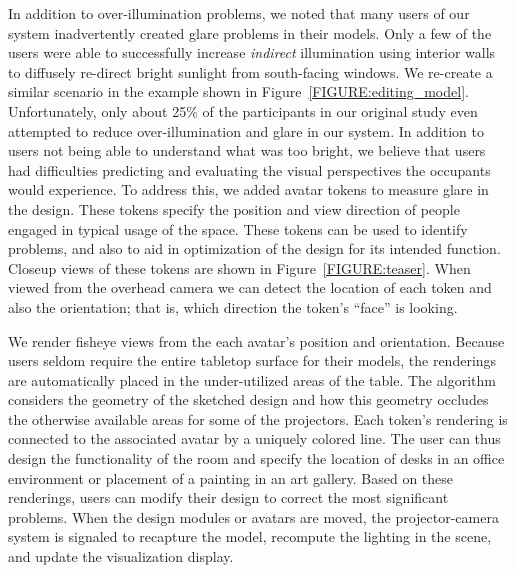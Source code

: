 \documentclass[10pt,twocolumn,letterpaper]{article}
\begin{document}
In addition to over-illumination problems, we noted that many users of
our system inadvertently created glare problems in their models.  Only
a few of the users were able to successfully increase {\em indirect}
illumination using interior walls to diffusely re-direct bright
sunlight from south-facing windows.  We re-create a similar scenario
in the example shown
in Figure~\ref{FIGURE:editing_model}.  Unfortunately, only about 25\%
of the participants in our original study even attempted to reduce
over-illumination and glare in our system.  In addition to users not
being able to understand what was too bright, we believe that users
had difficulties predicting and evaluating the visual perspectives the
occupants would experience.  To address this, we added avatar tokens
to measure glare in the design.  These tokens specify the position and
view direction of people engaged in typical usage of the space.  These
tokens can be used to identify problems, and also to aid in
optimization of the design for its intended function.
%
%
Closeup views of these tokens are shown in Figure~\ref{FIGURE:teaser}.
When viewed from the overhead camera we can detect the location of
each token and also the orientation; that is, which direction the
token's ``face'' is looking.

We render fisheye views from the each avatar's position and
orientation.  Because users seldom require the entire tabletop surface
for their models, the renderings are automatically placed in the
under-utilized areas of the table.  
The algorithm considers the geometry of the sketched design and how
this geometry occludes the otherwise available areas for some of the
projectors.  Each token's rendering is connected to the associated
avatar by a uniquely colored line.  The user can thus design the
functionality of the room and specify the location of desks in an
office environment or placement of a painting in an art gallery.
Based on these renderings, users can modify their design to correct
the most significant problems.
%
When the design modules or avatars are moved, the projector-camera system is signaled to recapture the model, 
recompute the lighting in the scene, and update the visualization
display.
\end{document}
